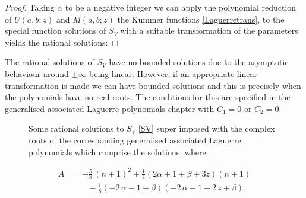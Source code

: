 \documentclass[12pt]{article}
\numberwithin{figure}{section}
\numberwithin{equation}{section}
\numberwithin{table}{section}
\begin{document}
\begin{proof}
Taking $\alpha$ to be a negative integer we can apply the polynomial reduction of $U(a,b;z)$ and $M(a,b;z)$ the Kummer functions \eqref{Laguerretrans}, to the special function solutions of $S_{V}$ with a suitable transformation of the parameters yields the rational solutions:
\end{proof}
The rational solutions of $S_{V}$ have no bounded solutions due
to the asymptotic behaviour around $\pm\infty$ being linear. However, if an appropriate linear transformation is made we can have bounded solutions and this is precisely when the polynomials have no real roots. The conditions for this are specified in the generalised associated Laguerre polynomials chapter with $C_1=0$ or $C_2=0$.

\begin{figure}[H]
\centering
{}
\caption{Some rational solutions to $S_{V}$ \eqref{SV} super imposed with the complex roots of the corresponding generalised associated Laguerre polynomials which comprise the solutions, where}
\end{figure}
\begin{align*}
A&=-\tfrac{5}{8}\,{(n+1)}^{2}+
\tfrac{1}{4}\left(2\alpha+1+\beta+3z\right) (n+1)\\
&\qquad-\tfrac{1}{8}\left( -2\,\alpha-1+\beta \right)  \left( -2\,\alpha-1-2\,z+\beta\right).
\end{align*}
\end{document}
